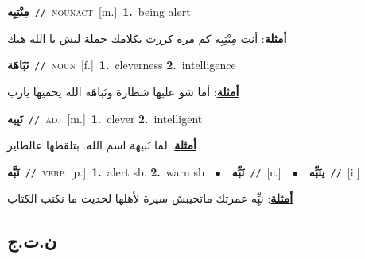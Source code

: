 \documentclass[10pt,a4paper,twoside]{article} %
\begin{document}
\begin{multicols}{2}
{\setlength\topsep{0pt}\textbf{\foreignlanguage{arabic}{مِنْتِبِه}}\ {\color{gray}\texttt{//}\color{black}}\ \textsc{noun\textunderscore act}\ [m.]\ \textbf{1.}~being alert\  \begin{flushright}\color{gray}\foreignlanguage{arabic}{\textbf{\underline{\foreignlanguage{arabic}{أمثلة}}}: أنت مِنْتِبِه كم مرة كررت بكلامك جملة ليش يا الله هيك}\end{flushright}\color{black}} \vspace{2mm}

{\setlength\topsep{0pt}\textbf{\foreignlanguage{arabic}{نَبَاهَة}}\ {\color{gray}\texttt{//}\color{black}}\ \textsc{noun}\ [f.]\ \textbf{1.}~cleverness  \textbf{2.}~intelligence\  \begin{flushright}\color{gray}\foreignlanguage{arabic}{\textbf{\underline{\foreignlanguage{arabic}{أمثلة}}}: أما شو عليها شطارة ونَباهَة الله يحميها يارب}\end{flushright}\color{black}} \vspace{2mm}

{\setlength\topsep{0pt}\textbf{\foreignlanguage{arabic}{نَبِيه}}\ {\color{gray}\texttt{//}\color{black}}\ \textsc{adj}\ [m.]\ \textbf{1.}~clever  \textbf{2.}~intelligent\  \begin{flushright}\color{gray}\foreignlanguage{arabic}{\textbf{\underline{\foreignlanguage{arabic}{أمثلة}}}: لما نَبيهة اسم الله. بتلقطها عالطاير}\end{flushright}\color{black}} \vspace{2mm}

{\setlength\topsep{0pt}\textbf{\foreignlanguage{arabic}{نَبَّه}}\ {\color{gray}\texttt{//}\color{black}}\ \textsc{verb}\ [p.]\ \textbf{1.}~alert sb.  \textbf{2.}~warn sb\ \ $\bullet$\ \ \setlength\topsep{0pt}\textbf{\foreignlanguage{arabic}{نَبِّه}}\ {\color{gray}\texttt{//}\color{black}}\ [c.]\ \ $\bullet$\ \ \setlength\topsep{0pt}\textbf{\foreignlanguage{arabic}{ينَبِّه}}\ {\color{gray}\texttt{//}\color{black}}\ [i.]\  \begin{flushright}\color{gray}\foreignlanguage{arabic}{\textbf{\underline{\foreignlanguage{arabic}{أمثلة}}}: نبِِّه عمرتك ماتجيبش سيرة لأهلها لحديت ما نكتب الكتاب}\end{flushright}\color{black}} \vspace{2mm}

\vspace{-3mm}
\subsection*{\color{blue}\foreignlanguage{arabic}{ن.ت.ج}\color{blue}{}} 


\end{multicols}
\end{document}

